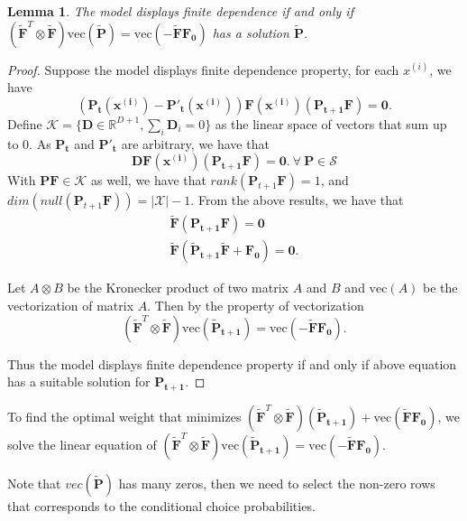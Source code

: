 \documentclass{article}
\def\bs{\boldsymbol}
\newtheorem{lemma}[theorem]{Lemma}
\newcommand{\R}{\mathbb{R}}
\begin{document}
 \begin{lemma}
 	The model displays finite dependence if and only if $\left(\bs{\tilde{F}}^T \otimes \bs{\tilde{F}} \right)\text{vec}(\bs{\tilde{P}}) = \text{vec}(-\bs{\tilde{F}} \bs{F_0})$ has a solution $\bs{\tilde{P}}$.
 \end{lemma}
 \begin{proof}
 	Suppose the model displays finite dependence property, for each $x^{(i)}$, we have
 	\[\left(\bs{P_{t}(x^{(i)})} - \bs{P'_{t}(x^{(i)})}  \right)\bs{F(x^{(i)})} \left(\bs{P_{t+1}} \bs{F}  \right) = \bs{0}.
 	\]
 	Define $\mathcal{K} = \{\bs{D} \in \R^{D+1}, \sum_{i} \bs{D}_i = 0  \} $ as the linear space of vectors that sum up to 0.
 	As $\bs{P_{t}}$ and $\bs{P'_{t}}$ are arbitrary, we have that
 	\[\bs{D}\bs{F(x^{(i)})} \left(\bs{P_{t+1}} \bs{F}  \right) = \bs{0}.  ~ \forall ~ \bs{P} \in \mathcal{S}\]
 	With $\bs{P}\bs{F} \in \mathcal{K}$ as well, we have that $rank(\bs{P}_{t+1}\bs{F}) = 1 $, and $dim ( null(\bs{P}_{t+1}\bs{F}) ) = |\mathcal{X}| - 1 $.
 	From the above results, we have that \[ \begin{split}
 	\bs{\tilde{F}} \left(\bs{P_{t+1}} \bs{F}  \right) = \bs{0} \\
 	\bs{\tilde{F}} \left(\bs{\tilde{P}_{t+1}} \bs{\tilde{F}} + \bs{F_0}  \right) = \bs{0}  . \end{split} \]

 	Let $A\otimes B$ be the Kronecker product of two matrix $A$ and $B$ and $\text{vec}(A)$ be the vectorization of matrix $A$. Then by the property of vectorization
 	$$\left(\bs{\tilde{F}}^T \otimes \bs{\tilde{F}} \right)\text{vec}(\bs{\tilde{P}_{t+1}}) = \text{vec}(-\bs{\tilde{F}} \bs{F_0}).$$

 	Thus the model  displays finite dependence property if and only if above equation has a suitable solution for $\bs{P_{t+1}}$.
 \end{proof}

To find the optimal weight that minimizes $\left(\tilde{\bs{F}}^T \otimes \tilde{\bs{F}} \right) (\bs{\tilde{P}_{t+1}}) + \text{vec}(\bs{\tilde{F}} \bs{F_0}) $, we solve the linear equation of $\left(\bs{\tilde{F}}^T \otimes \bs{\tilde{F}} \right)\text{vec}(\bs{\tilde{P}_{t+1}}) = \text{vec}(-\bs{\tilde{F}} \bs{F_0}).$

Note that $vec(\tilde{\bs{P}})$ has many zeros, then we need to select the non-zero rows that corresponds to the conditional choice probabilities.
\end{document}
